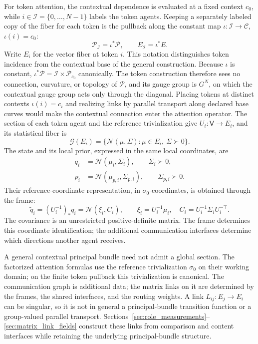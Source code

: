 \documentclass[twoside,11pt]{article}
\begin{document}
For token attention, the contextual dependence is evaluated at a fixed context \(c_0\), while \(i\in\mathcal I=\{0,\ldots,N-1\}\) labels the token agents. Keeping a separately labeled copy of the fiber for each token is the pullback along the constant map \(\iota:\mathcal I\to\mathcal C\), \(\iota(i)=c_0\):
\begin{equation}
\mathcal P_{\mathcal I}=\iota^*\mathcal P,
\qquad E_{\mathcal I}=\iota^*E.
\label{eq:token_bundle_pullback}
\end{equation}
Write \(E_i\) for the vector fiber at token \(i\). This notation distinguishes token incidence from the contextual base of the general construction. Because \(\iota\) is constant, \(\iota^*\mathcal P=\mathcal I\times\mathcal P_{c_0}\) canonically. The token construction therefore sees no connection, curvature, or topology of \(\mathcal P\), and its gauge group is \(G^N\), on which the contextual gauge group acts only through the diagonal. Placing tokens at distinct contexts \(\iota(i)=c_i\) and realizing links by parallel transport along declared base curves would make the contextual connection enter the attention operator. The section of each token agent and the reference trivialization give \(U_i:\mathsf V\to E_i\), and its statistical fiber is
\begin{equation}
\mathcal G(E_i)=\{\mathcal N(\mu,\Sigma):\mu\in E_i,\ \Sigma\succ0\}.
\label{eq:overview_statistical_fiber}
\end{equation}
The state and its local prior, expressed in the same local coordinates, are
\begin{align}
q_i&=\mathcal N(\mu_i,\Sigma_i),\qquad \Sigma_i\succ0,\label{eq:gaussian_states}\\
p_i&=\mathcal N(\mu_{p,i},\Sigma_{p,i}),\qquad \Sigma_{p,i}\succ0.\label{eq:base_priors}
\end{align}
Their reference-coordinate representation, in \(\sigma_0\)-coordinates, is obtained through the frame:
\begin{equation}
\widetilde q_i=(U_i^{-1})_*q_i
=\mathcal N(\xi_i,C_i),\qquad
\xi_i=U_i^{-1}\mu_i,\quad
C_i=U_i^{-1}\Sigma_iU_i^{-\top}.
\label{eq:overview_reference_state}
\end{equation}
The covariance is an unrestricted positive-definite matrix. The frame determines this coordinate identification; the additional communication interfaces determine which directions another agent receives.

A general contextual principal bundle need not admit a global section. The factorized attention formulas use the reference trivialization \(\sigma_0\) on their working domain; on the finite token pullback this trivialization is canonical. The communication graph is additional data; the matrix links on it are determined by the frames, the shared interfaces, and the routing weights. A link \(L_{ij}:E_j\to E_i\) can be singular, so it is not in general a principal-bundle transition function or a group-valued parallel transport. Sections~\ref{sec:role_measurements}--\ref{sec:matrix_link_fields} construct these links from comparison and content interfaces while retaining the underlying principal-bundle structure.
\end{document}
